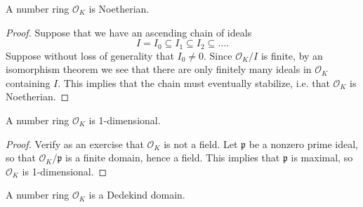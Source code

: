\begin{corollary}
  A number ring $\mathcal{O}_K$ is Noetherian.
\end{corollary}

\begin{proof}
  Suppose that we have an ascending chain of ideals
  \[
    I = I_0 \subseteq I_1 \subseteq I_2 \subseteq \dots.
  \]
  Suppose without loss of generality that $I_0 \ne 0$.
  Since $\mathcal{O}_K / I$ is finite, by an isomorphism
  theorem we see that there are only finitely many ideals
  in $\mathcal{O}_K$ containing $I$. This implies that
  the chain must eventually stabilize, i.e. that
  $\mathcal{O}_K$ is Noetherian.
\end{proof}

\begin{corollary}
  A number ring $\mathcal{O}_K$ is 1-dimensional.
\end{corollary}

\begin{proof}
  Verify as an exercise that $\mathcal{O}_K$ is not
  a field.
  Let $\mathfrak{p}$ be a nonzero prime ideal, so that
  $\mathcal{O}_K / \mathfrak{p}$ is a finite domain,
  hence a field. This implies that $\mathfrak{p}$ is
  maximal, so $\mathcal{O}_K$ is 1-dimensional.
\end{proof}

\begin{theorem}
  A number ring $\mathcal{O}_K$ is a Dedekind domain.
\end{theorem}
